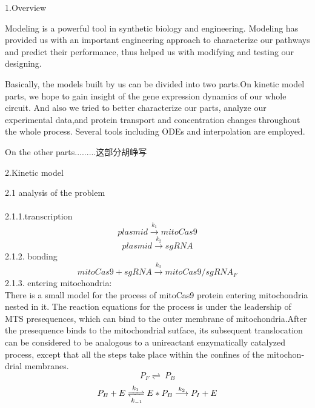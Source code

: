 \documentclass[UTF8]{ctexart}%
\begin{document}
	\begin{center}
		{\Large 1.Overview} 
	\end{center}
   Modeling is a powerful tool in synthetic biology and engineering. Modeling has provided us with an important engineering approach to characterize our pathways and predict their performance, thus helped us with modifying and testing our designing.
	
	Basically, the models built by us can be divided into two parts.On kinetic model parts, we hope to gain insight of the gene expression dynamics of our whole circuit. And also we tried to better characterize our parts, analyze our experimental data,and protein transport and concentration changes throughout the whole process. Several tools including ODEs and interpolation are employed.
	
	On the other parts.........这部分胡峥写
	\begin{center}
	{\Large 2.Kinetic model} 
    \end{center}
  {\Large 2.1 analysis of the problem} 
\\\\
2.1.1.transcription
	\begin{displaymath}
	plasmid \stackrel{k_1}{\longrightarrow} mitoCas9 
	\end{displaymath}
	\begin{displaymath}
	plasmid\stackrel{k_2}{\longrightarrow}sgRNA
	\end{displaymath}
	2.1.2. bonding
	\begin{displaymath}
	mitoCas9+sgRNA\stackrel{k_3}{\longrightarrow}mitoCas9/sgRNA_F
	\end{displaymath}
	2.1.3. entering mitochondria:\\
There is a small model for the process of mitoCas9 protein entering mitochondria nested in it.
The reaction equations for the process is under the leadership of MTS presequences, which can bind to the outer membrane of mitochondria.After the presequence binds to the mitochondrial sutface, its
subsequent translocation can be considered to be analogous to a unireactant enzymatically catalyzed process, except that all the steps take place within the confines of the mitochon­ drial membranes. 
\begin{displaymath}
P_F\rightleftharpoons\ P_B
\end{displaymath}
\begin{displaymath}
P_B+E \xrightleftharpoons[k_{-1}]{k_1}  E * P_B \stackrel{k_2}{\longrightarrow} P_I+E
\end{displaymath}
\end{document}
